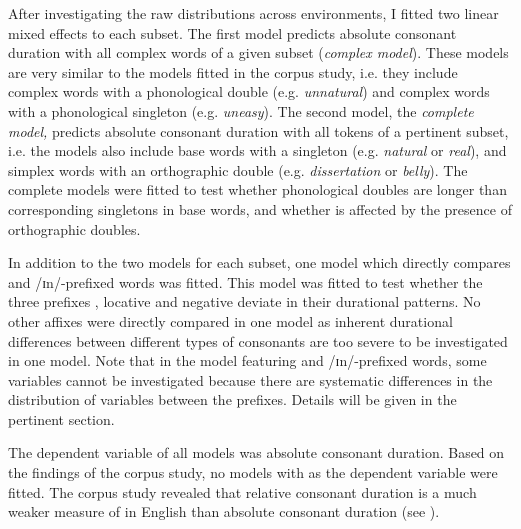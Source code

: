 After investigating the raw distributions across environments, I fitted two linear mixed effects  to each subset. 
The first model predicts absolute consonant duration with all complex words of a given subset (\textit{complex model}). These models are very similar to the models fitted in the corpus study, i.e. they include complex words with a phonological double (e.g. \textit{unnatural}) and complex words with a phonological singleton (e.g. \textit{uneasy}). 
The second model, the \textit{complete model,} predicts absolute consonant duration with all tokens of a pertinent subset, i.e. the models also include base words with a singleton (e.g. \textit{natural} or \textit{real}), and simplex words with an orthographic double (e.g. \textit{dissertation} or \textit{belly}). The complete models were fitted to test whether phonological doubles are longer than corresponding singletons in base words, and whether  is affected by the presence of orthographic doubles. 

In addition to the two models for each subset, one model which directly compares  and /ɪn/-prefixed words was fitted. This model was fitted to test whether the three prefixes , locative  and negative  deviate in their durational patterns. No other affixes were directly compared in one model as inherent durational differences between different types of consonants are too severe to be investigated in one model. Note that in the model featuring  and /ɪn/-prefixed words, some variables cannot be investigated because there are systematic differences in the distribution of variables between the prefixes. Details will be given in the pertinent section.


The dependent variable of all models was absolute consonant duration. Based on the findings of the corpus study, no models with  as the dependent variable were fitted.  The corpus study revealed that relative consonant duration is a much weaker measure of  in English than absolute consonant duration (see ).

